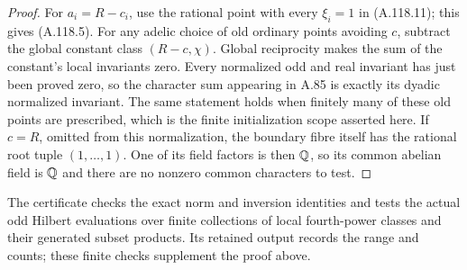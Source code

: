 \begin{proof}
For $a_i=R-c_i$, use the rational point with every
$\xi_i=1$ in (A.118.11); this gives (A.118.5).
For any adelic choice of old ordinary points avoiding $c$,
subtract the global constant class $(R-c,\chi)$.
Global reciprocity makes the sum of the constant's local
invariants zero.  Every normalized odd and real invariant
has just been proved zero, so the character sum appearing
in A.85 is exactly its dyadic normalized invariant.
The same statement holds when finitely many of these old
points are prescribed, which is the finite initialization
scope asserted here.
If $c=R$, omitted from this normalization, the boundary
fibre itself has the rational root tuple $(1,\ldots,1)$.
One of its field factors is then $\mathbb Q$, so its common
abelian field is $\mathbb Q$ and there are no nonzero common
characters to test.
\end{proof}

The certificate
checks the exact norm and inversion identities and tests
the actual odd Hilbert evaluations over finite collections
of local fourth-power classes and their generated subset
products.  Its retained output records the range and
counts; these finite checks supplement the proof above.
